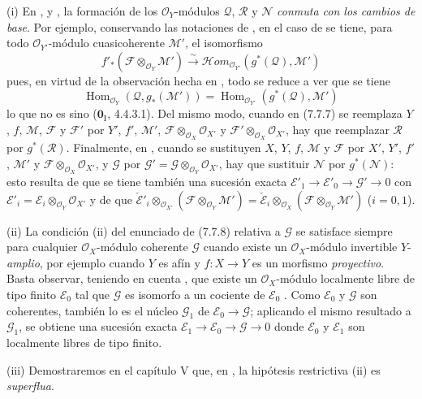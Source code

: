 \begin{remarks}[7.7.9]
\label{III.7.7.9}
\textnormal{(i)} En ,  y
, la formación de los $\mathscr O_Y$-módulos $\mathscr Q$,
$\mathscr R$ y $\mathscr N$ \emph{conmuta con los cambios de base}. Por ejemplo,
conservando las notaciones de , en el caso de
 se tiene, para todo $\mathscr O_{Y'}$-módulo cuasicoherente
$\mathscr M'$, el isomorfismo
\[
  f'_*(\mathscr F\otimes_{\mathscr O_Y}\mathscr M')
  \xrightarrow{\sim}
  \mathscr{H}\!om_{\mathscr O_{Y'}}(g^*(\mathscr Q),\mathscr M')
\]
pues, en virtud de la observación hecha en , todo se reduce a
ver que se tiene
\[
  \operatorname{Hom}_{\mathscr O_Y}(\mathscr Q,g_*(\mathscr M'))
  =
  \operatorname{Hom}_{\mathscr O_{Y'}}(g^*(\mathscr Q),\mathscr M')
\]
lo que no es sino ($\mathbf{0}_{\mathrm I}$, 4.4.3.1). Del mismo modo, cuando en (7.7.7)
se reemplaza $Y$, $f$, $\mathscr M$, $\mathscr F$ y
$\mathscr F'$ por $Y'$, $f'$, $\mathscr M'$,
$\mathscr F\otimes_{\mathscr O_X}\mathscr O_{X'}$ y
$\mathscr F'\otimes_{\mathscr O_X}\mathscr O_{X'}$, hay que reemplazar
$\mathscr R$ por $g^*(\mathscr R)$. Finalmente, en
, cuando se sustituyen $X$, $Y$, $f$, $\mathscr M$ y
$\mathscr F$ por $X'$, $Y'$, $f'$, $\mathscr M'$ y
$\mathscr F\otimes_{\mathscr O_X}\mathscr O_{X'}$, y $\mathscr G$ por
$\mathscr G'=\mathscr G\otimes_{\mathscr O_Y}\mathscr O_{X'}$,
hay que sustituir $\mathscr N$ por $g^*(\mathscr N)$: esto resulta de que se tiene también una
sucesión exacta
$\mathscr E'_1\longrightarrow\mathscr E'_0\longrightarrow\mathscr G'\longrightarrow0$ con
$\mathscr E'_i=\mathscr E_i\otimes_{\mathscr O_Y}\mathscr O_{X'}$
y de que
$  \check{\mathscr E}'_i
  \otimes_{\mathscr O_{X'}}
  (\mathscr F\otimes_{\mathscr O_Y}\mathscr M')
  =
  \check{\mathscr E}_i
  \otimes_{\mathscr O_X}
  (\mathscr F\otimes_{\mathscr O_Y}\mathscr M')$ ($i=0,1$).

\medskip
\textnormal{(ii)} La condición (ii) del enunciado de (7.7.8) relativa a
$\mathscr G$ se satisface siempre para cualquier
$\mathscr O_X$-módulo coherente $\mathscr G$ cuando existe un
$\mathscr O_X$-módulo invertible $Y$-\emph{amplio}, por ejemplo cuando $Y$ es afín y
$f:X\to Y$ es un morfismo \emph{proyectivo}. Basta observar, teniendo en cuenta
, que existe un $\mathscr O_X$-módulo localmente libre de
tipo finito $\mathscr E_0$ tal que $\mathscr G$ es isomorfo a un cociente de
$\mathscr E_0$ . Como $\mathscr E_0$ y $\mathscr G$ son
coherentes, también lo es el núcleo $\mathscr G_1$ de
$\mathscr E_0\to\mathscr G$; aplicando el mismo resultado a $\mathscr G_1$, se
obtiene una sucesión exacta
$\mathscr E_1\to\mathscr E_0\to\mathscr G\to0$
donde $\mathscr E_0$ y $\mathscr E_1$ son localmente libres de tipo finito.

\medskip
\textnormal{(iii)} Demostraremos en el capítulo V que, en
, la hipótesis restrictiva (ii) es \emph{superflua}.
\end{remarks}

